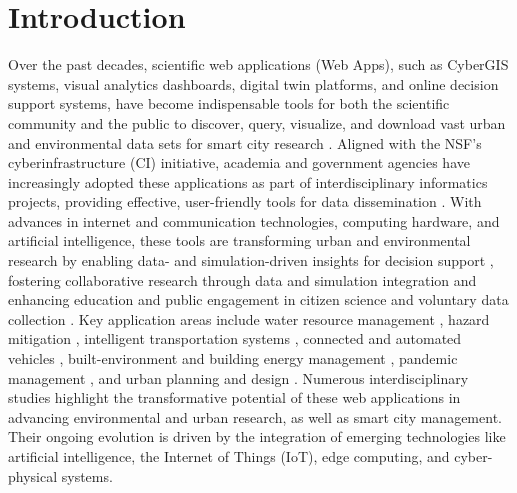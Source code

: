 \section{Introduction}
\label{Introduction}
Over the past decades, scientific web applications (Web Apps), such as CyberGIS systems, visual analytics dashboards, digital twin platforms, and online decision support systems, have become indispensable tools for both the scientific community and the public to discover, query, visualize, and download vast urban and environmental data sets for smart city research \citep{ferre2022adoption, dembski2020urban}. Aligned with the NSF's cyberinfrastructure (CI) initiative, academia and government agencies have increasingly adopted these applications as part of interdisciplinary informatics projects, providing effective, user-friendly tools for data dissemination \citep{yu2021coevolution}. With advances in internet and communication technologies, computing hardware, and artificial intelligence, these tools are transforming urban and environmental research by enabling data- and simulation-driven insights for decision support \citep{kadupitige2022enhancing}, fostering collaborative research through data and simulation integration \citep{parashar2019virtual} and enhancing education and public engagement in citizen science and voluntary data collection \citep{skarlatidou2019volunteers}. Key application areas include water resource management \citep{souffront2018cyberinfrastructure, xu2022overview}, hazard mitigation \citep{mandal2024prime, xu2020web, garg2018cloud}, intelligent transportation systems \citep{xu2023smart, xu2022interactive, ghosh2017intelligent}, connected and automated vehicles \citep{xu2023mobile, kampmann2019dynamic}, built-environment and building energy management \citep{jia2019adopting, kim2022design, xu2022geo}, pandemic management \citep{xu2021episemblevis, li2021emerging, thakur2020covid}, and urban planning and design \citep{alatalo2017two}. Numerous interdisciplinary studies highlight the transformative potential of these web applications in advancing environmental and urban research, as well as smart city management. Their ongoing evolution is driven by the integration of emerging technologies like artificial intelligence, the Internet of Things (IoT), edge computing, and cyber-physical systems.


